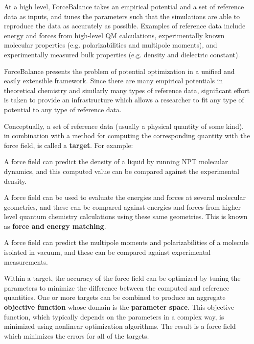 \-At a high level, \-Force\-Balance takes an empirical potential and a set of reference data as inputs, and tunes the parameters such that the simulations are able to reproduce the data as accurately as possible. \-Examples of reference data include energy and forces from high-\/level \-Q\-M calculations, experimentally known molecular properties (e.\-g. polarizabilities and multipole moments), and experimentally measured bulk properties (e.\-g. density and dielectric constant).

\-Force\-Balance presents the problem of potential optimization in a unified and easily extensible framework. \-Since there are many empirical potentials in theoretical chemistry and similarly many types of reference data, significant effort is taken to provide an infrastructure which allows a researcher to fit any type of potential to any type of reference data.

\-Conceptually, a set of reference data (usually a physical quantity of some kind), in combination with a method for computing the corresponding quantity with the force field, is called a {\bfseries target}. \-For example\-:


\begin{DoxyItemize}
\item \-A force field can predict the density of a liquid by running \-N\-P\-T molecular dynamics, and this computed value can be compared against the experimental density.
\end{DoxyItemize}


\begin{DoxyItemize}
\item \-A force field can be used to evaluate the energies and forces at several molecular geometries, and these can be compared against energies and forces from higher-\/level quantum chemistry calculations using these same geometries. \-This is known as {\bfseries force and energy matching}.
\end{DoxyItemize}


\begin{DoxyItemize}
\item \-A force field can predict the multipole moments and polarizabilities of a molecule isolated in vacuum, and these can be compared against experimental measurements.
\end{DoxyItemize}

\-Within a target, the accuracy of the force field can be optimized by tuning the parameters to minimize the difference between the computed and reference quantities. \-One or more targets can be combined to produce an aggregate {\bfseries objective function} whose domain is the {\bfseries parameter space}. \-This objective function, which typically depends on the parameters in a complex way, is minimized using nonlinear optimization algorithms. \-The result is a force field which minimizes the errors for all of the targets.



